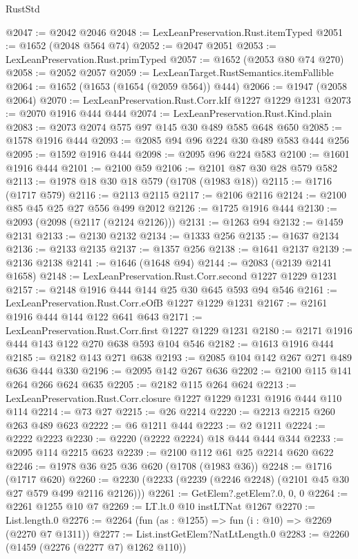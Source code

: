 \begin{lexlean}{RustStd}
\begin{coremodule}
{\begin{coremodule}
{{{{{{{{{{{@2047 := @2042 @2046
@2048 := LexLeanPreservation.Rust.itemTyped
@2051 := @1652 (@2048 @564 @74)
@2052 := @2047 @2051
@2053 := LexLeanPreservation.Rust.primTyped
@2057 := @1652 (@2053 @80 @74 @270)
@2058 := @2052 @2057
@2059 := LexLeanTarget.RustSemantics.itemFallible
@2064 := @1652 (@1653 (@1654 (@2059 @564)) @444)
@2066 := @1947 (@2058 @2064)
@2070 := LexLeanPreservation.Rust.Corr.kIf @1227 @1229 @1231
@2073 := @2070 @1916 @444 @444
@2074 := LexLeanPreservation.Rust.Kind.plain
@2083 := @2073 @2074 @575 @97 @145 @30 @489 @585 @648 @650
@2085 := @1578 @1916 @444
@2093 := @2085 @94 @96 @224 @30 @489 @583 @444 @256
@2095 := @1592 @1916 @444
@2098 := @2095 @96 @224 @583
@2100 := @1601 @1916 @444
@2101 := @2100 @59
@2106 := @2101 @87 @30 @28 @579 @582
@2113 := @1978 @18 @30 @18 @579 (@1708 (@1983 @18))
@2115 := @1716 (@1717 @579)
@2116 := @2113 @2115
@2117 := @2106 @2116
@2124 := @2100 @85 @45 @25 @27 @556 @499 @2012
@2126 := @1725 @1916 @444
@2130 := @2093 (@2098 (@2117 (@2124 @2126)))
@2131 := @1263 @94
@2132 := @1459 @2131
@2133 := @2130 @2132
@2134 := @1333 @256
@2135 := @1637 @2134
@2136 := @2133 @2135
@2137 := @1357 @256
@2138 := @1641 @2137
@2139 := @2136 @2138
@2141 := @1646 (@1648 @94)
@2144 := @2083 (@2139 @2141 @1658)
@2148 := LexLeanPreservation.Rust.Corr.second @1227 @1229 @1231
@2157 := @2148 @1916 @444 @144 @25 @30 @645 @593 @94 @546
@2161 := LexLeanPreservation.Rust.Corr.eOfB @1227 @1229 @1231
@2167 := @2161 @1916 @444 @144 @122 @641 @643
@2171 := LexLeanPreservation.Rust.Corr.first @1227 @1229 @1231
@2180 := @2171 @1916 @444 @143 @122 @270 @638 @593 @104 @546
@2182 := @1613 @1916 @444
@2185 := @2182 @143 @271 @638
@2193 := @2085 @104 @142 @267 @271 @489 @636 @444 @330
@2196 := @2095 @142 @267 @636
@2202 := @2100 @115 @141 @264 @266 @624 @635
@2205 := @2182 @115 @264 @624
@2213 := LexLeanPreservation.Rust.Corr.closure @1227 @1229 @1231 @1916 @444 @110 @114
@2214 := @73 @27
@2215 := @26 @2214
@2220 := @2213 @2215 @260 @263 @489 @623
@2222 := @6 @1211 @444
@2223 := @2 @1211
@2224 := @2222 @2223
@2230 := @2220 (@2222 @2224) @18 @444 @444 @344
@2233 := @2095 @114 @2215 @623
@2239 := @2100 @112 @61 @25 @2214 @620 @622
@2246 := @1978 @36 @25 @36 @620 (@1708 (@1983 @36))
@2248 := @1716 (@1717 @620)
@2260 := @2230 (@2233 (@2239 (@2246 @2248) (@2101 @45 @30 @27 @579 @499 @2116 @2126)))
@2261 := GetElem?.getElem?.{0, 0, 0}
@2264 := @2261 @1255 @10 @7
@2269 := LT.lt.{0} @10 instLTNat @1267
@2270 := List.length.{0}
@2276 := @2264 (fun (as : @1255) => fun (i : @10) => @2269 (@2270 @7 @1311))
@2277 := List.instGetElem?NatLtLength.{0}
@2283 := @2260 (@1459 (@2276 (@2277 @7) @1262 @110))
}}}}}}}}}}}
\end{coremodule}}
\end{coremodule}
\end{lexlean}
